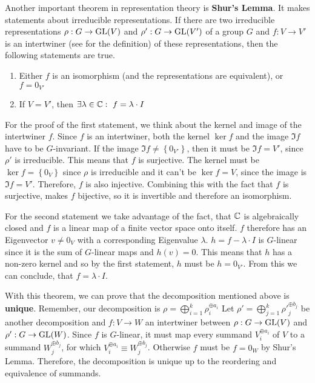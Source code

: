 Another important theorem in representation theory is \textbf{Shur's Lemma}.
It makes statements about irreducible representations.
If there are two irreducible representations $\rho: G \to \operatorname{GL}(V)$ and $\rho': G \to \operatorname{GL}(V')$ of a group $G$ and $f: V \to V'$ is an intertwiner (see  for the definition) of these representations, then the following statements are true.
\begin{enumerate}
    \item Either $f$ is an isomorphism (and the representations are equivalent), or $f = 0_{V'}$
    \item If $V = V'$, then $\exists \lambda \in \mathbb{C}:\ f = \lambda \cdot I$
\end{enumerate}
For the proof of the first statement, we think about the kernel and image of the intertwiner $f$.
Since $f$ is an intertwiner, both the kernel $\ker f$ and the image $\Im f$ have to be $G$-invariant.
If the image $\Im f \neq \left\{ 0_{V'} \right\}$, then it must be $\Im f = V'$, since $\rho'$ is irreducible.
This means that $f$ is surjective.
The kernel must be $\ker f = \left\{ 0_V \right\}$ since $\rho$ is irreducible and it can't be $\ker f = V$, since the image is $\Im f = V'$.
Therefore, $f$ is also injective.
Combining this with the fact that $f$ is surjective, makes $f$ bijective, so it is invertible and therefore an isomorphism.

For the second statement we take advantage of the fact, that $\mathbb{C}$ is algebraically closed and $f$ is a linear map of a finite vector space onto itself.
$f$ therefore has an Eigenvector $v \neq 0_V$ with a corresponding Eigenvalue $\lambda$.
$h = f - \lambda \cdot I$ is $G$-linear since it is the sum of $G$-linear maps and $h(v) = 0$.
This means that $h$ has a non-zero kernel and so by the first statement, $h$ must be $h = 0_{V'}$.
From this we can conclude, that $f = \lambda \cdot I$.

With this theorem, we can prove that the decomposition mentioned above is \textbf{unique}.
Remember, our decomposition is $\rho = \bigoplus_{i=1}^k \rho^{\oplus a_i}_i$
Let $\rho' = \bigoplus_{j=1}^k \rho'^{\oplus b_j}_j$ be another decomposition and $f: V \to W$ an intertwiner between $\rho: G \to \operatorname{GL}(V)$ and $\rho': G \to \operatorname{GL}(W)$.
Since $f$ is $G$-linear, it must map every summand $V_i^{\oplus a_i}$ of $V$ to a summand $W_j^{\oplus b_j}$, for which $V_i^{\oplus a_i} \equiv W_j^{\oplus b_j}$.
Otherwise $f$ must be $f = 0_W$ by Shur's Lemma.
Therefore, the decomposition is unique up to the reordering and equivalence of summands.

